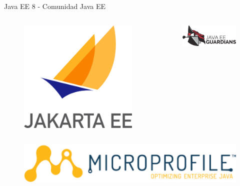 \documentclass{beamer}
\begin{document}
\begin{frame}{Java EE 8 - Comunidad Java EE}
\begin{columns}
\begin{column}{0.5\textwidth}
	\begin{figure}
		\centering
		\includegraphics[width=0.7\linewidth]{Images/jakartaee}
	\end{figure}
	\end{column}
	\begin{column}{0.5\textwidth}  %
		\begin{figure}
			\centering
			\includegraphics[width=\linewidth]{Images/guardians}
		\end{figure}
	\end{column}
\end{columns}

\begin{figure}
	\centering
	\includegraphics[width=0.7\linewidth]{Images/microprofile-logo}
\end{figure}
\end{frame}
\end{document}
